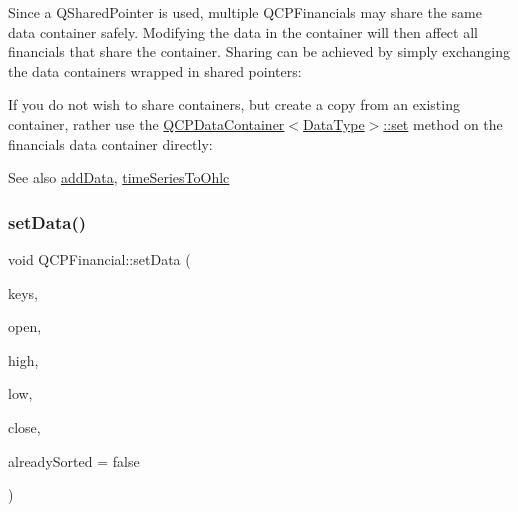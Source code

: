 Since a Q\+Shared\+Pointer is used, multiple Q\+C\+P\+Financials may share the same data container safely. Modifying the data in the container will then affect all financials that share the container. Sharing can be achieved by simply exchanging the data containers wrapped in shared pointers\+: 
\begin{DoxyCodeInclude}
\end{DoxyCodeInclude}
 If you do not wish to share containers, but create a copy from an existing container, rather use the \hyperlink{class_q_c_p_data_container_ae7042bd534fc3ce7befa2ce3f790b5bf}{Q\+C\+P\+Data\+Container$<$\+Data\+Type$>$\+::set} method on the financial\textquotesingle{}s data container directly\+: 
\begin{DoxyCodeInclude}
\end{DoxyCodeInclude}
 \begin{DoxySeeAlso}{See also}
\hyperlink{class_q_c_p_financial_a372ac031e44a7a6c912d203556af96f7}{add\+Data}, \hyperlink{class_q_c_p_financial_a9a058c035040d3939b8884f4aaccb1a7}{time\+Series\+To\+Ohlc} 
\end{DoxySeeAlso}
\mbox{\label{class_q_c_p_financial_a12992e669ed19d7bb48dbe601570cc05}} 
\subsubsection{\texorpdfstring{set\+Data()}{setData()}\hspace{0.1cm}{\footnotesize\ttfamily [2/2]}}
{\footnotesize\ttfamily void Q\+C\+P\+Financial\+::set\+Data (\begin{DoxyParamCaption}\item[{const \hyperlink{class_q_vector}{Q\+Vector}$<$ double $>$ \&}]{keys,  }\item[{const \hyperlink{class_q_vector}{Q\+Vector}$<$ double $>$ \&}]{open,  }\item[{const \hyperlink{class_q_vector}{Q\+Vector}$<$ double $>$ \&}]{high,  }\item[{const \hyperlink{class_q_vector}{Q\+Vector}$<$ double $>$ \&}]{low,  }\item[{const \hyperlink{class_q_vector}{Q\+Vector}$<$ double $>$ \&}]{close,  }\item[{bool}]{already\+Sorted = {\ttfamily false} }\end{DoxyParamCaption})}

